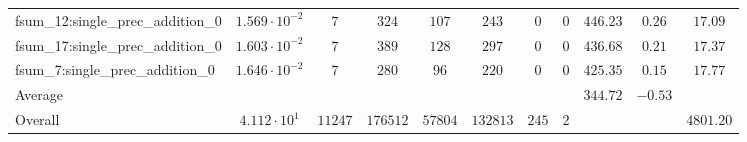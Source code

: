 \begin{tabular}{|l|c|c|c|c|c|c|c|c|c|c|}
fsum\_12:single\_prec\_addition\_0             & $ 1.569 \cdot 10^{-2} $ & $ 7      $ & $ 324    $ & $ 107   $ & $ 243    $ & $ 0   $ & $ 0 $ & $ 446.23      $ & $ 0.26    $ & $ 17.09   $ \\
fsum\_17:single\_prec\_addition\_0             & $ 1.603 \cdot 10^{-2} $ & $ 7      $ & $ 389    $ & $ 128   $ & $ 297    $ & $ 0   $ & $ 0 $ & $ 436.68      $ & $ 0.21    $ & $ 17.37   $ \\
fsum\_7:single\_prec\_addition\_0              & $ 1.646 \cdot 10^{-2} $ & $ 7      $ & $ 280    $ & $ 96    $ & $ 220    $ & $ 0   $ & $ 0 $ & $ 425.35      $ & $ 0.15    $ & $ 17.77   $ \\
\hline
Average                                        & $                     $ & $        $ & $        $ & $       $ & $        $ & $     $ & $   $ & $ 344.72      $ & $ -0.53   $ & $         $ \\
\hline
Overall                                        & $ 4.112 \cdot 10^{1}  $ & $ 11247  $ & $ 176512 $ & $ 57804 $ & $ 132813 $ & $ 245 $ & $ 2 $ & $             $ & $         $ & $ 4801.20 $ \\
\hline
\end{tabular}
